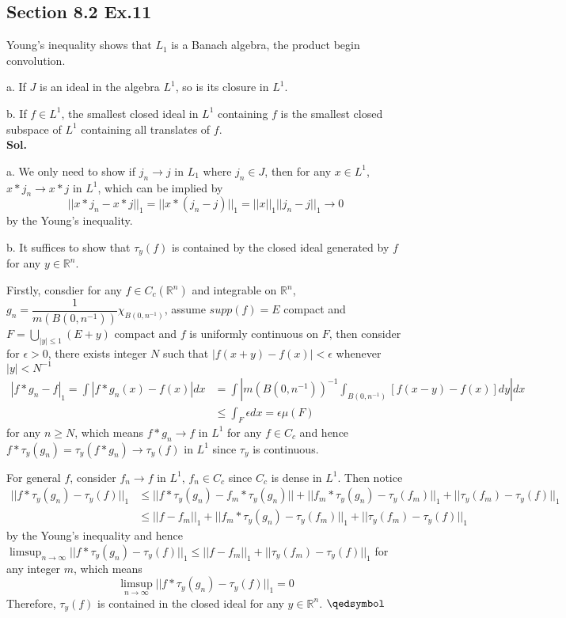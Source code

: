 \documentclass[lang=en,11pt,a4paper,citestyle =authoryear]{elegantpaper}
\newcommand{\prvd}{$\hfill \qedsymbol$}
\newcommand{\R}{\mathbb{R}}
\begin{document}
\subsection*{Section 8.2 Ex.11} 
Young's inequality shows that $L_1$ is a Banach algebra, the product begin convolution.\par
a. If $J$ is an ideal in the algebra $L^1$, so is its closure in $L^1$.\par
b. If $f\in L^1$, the smallest closed ideal in $L^1$ containing $f$ is the smallest closed subspace of $L^1$ containing all translates of $f$.
\vspace{0.5em} \\
\textbf{Sol.} \par
a. We only need to show if $j_n \to j$ in $L_1$ where $j_n \in J$, then for any $x\in L^1$, $x*j_n \to x*j$ in $L^1$, which can be implied by
\[
||x*j_n - x*j||_1 = ||x*(j_n-j)||_1 = ||x||_1||j_n-j||_1 \to 0 
\]
by the Young's inequality.\par
b. It suffices to show that $\tau_y(f)$ is contained by the closed ideal generated by $f$ for any $y\in\R^n$.\par
Firstly, consdier for any $f\in C_c(\R^n)$ and integrable on $\R^n$, $g_n = \dfrac{1}{m(B(0,n^{-1}))}\chi_{B(0,n^{-1})}$, assume $supp(f) = E$ compact and $F = \bigcup_{|y|\leq 1}(E+y)$ compact and $f$ is uniformly continuous on $F$, then consider for $\epsilon > 0$, there exists integer $N$ such that $|f(x+y)-f(x)| < \epsilon$ whenever $|y|<N^{-1}$
\[
\begin{aligned}
|f*g_n-f|_1 = \int |f*g_n(x) - f(x)|dx &= \int |m(B(0,n^{-1}))^{-1}\int_{B(0,n^{-1})} [f(x-y)-f(x)] dy | dx \\
&\leq \int_F \epsilon dx = \epsilon \mu(F)  
\end{aligned}
\]
for any $n\geq N$, which means $f*g_n \to f$ in $L^1$ for any $f\in C_c$ and hence $f*\tau_y(g_n) = \tau_y(f*g_n) \to \tau_y(f)$ in $L^1$ since $\tau_y$ is continuous.\par
For general $f$, consider $f_n \to f$ in $L^1$, $f_n \in C_c$ since $C_c$ is dense in $L^1$. Then notice
\[
\begin{aligned}
||f*\tau_y(g_n) - \tau_y(f)||_1 &\leq ||f*\tau_y(g_n) - f_m*\tau_y(g_n)|| + ||f_m*\tau_y(g_n) - \tau_y(f_m)||_1 + ||\tau_y(f_m)- \tau_y(f)||_1 \\ &\leq ||f-f_m||_1+||f_m*\tau_y(g_n) - \tau_y(f_m)||_1 + ||\tau_y(f_m)- \tau_y(f)||_1
\end{aligned}
\]
by the Young's inequality and hence $\limsup_{n\to\infty}||f*\tau_y(g_n) - \tau_y(f)||_1 \leq ||f-f_m||_1 + ||\tau_y(f_m) - \tau_y(f)||_1$ for any integer $m$, which means
\[
\limsup_{n\to\infty}||f*\tau_y(g_n) - \tau_y(f)||_1 = 0
\] 
Therefore, $\tau_y(f)$ is contained in the closed ideal for any $y\in\R^n$.
\prvd
\vspace{0.5em}


\addappheadtotoc
\end{document}
